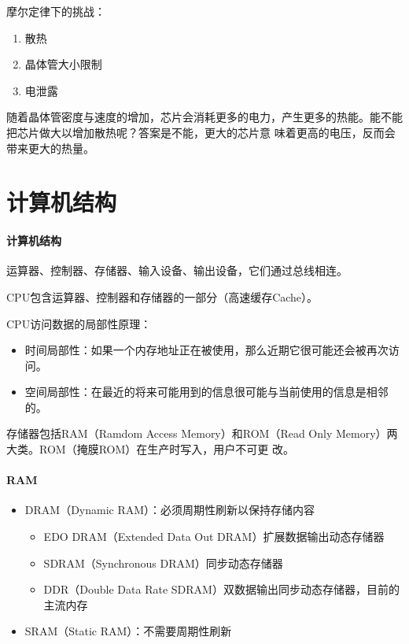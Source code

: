 \documentclass[UTF8]{ctexart}
\begin{document}
摩尔定律下的挑战：
\begin{enumerate}
    \item 散热
    \item 晶体管大小限制
    \item 电泄露
\end{enumerate}

随着晶体管密度与速度的增加，芯片会消耗更多的电力，产生更多的热能。能不能把芯片做大以增加散热呢？答案是不能，更大的芯片意
味着更高的电压，反而会带来更大的热量。

\section{计算机结构}
\paragraph{计算机结构}
运算器、控制器、存储器、输入设备、输出设备，它们通过总线相连。

CPU包含运算器、控制器和存储器的一部分（高速缓存Cache）。

CPU访问数据的局部性原理：
\begin{itemize}
    \item 时间局部性：如果一个内存地址正在被使用，那么近期它很可能还会被再次访问。
    \item 空间局部性：在最近的将来可能用到的信息很可能与当前使用的信息是相邻的。
\end{itemize}

存储器包括RAM（Ramdom Access Memory）和ROM（Read Only Memory）两大类。ROM（掩膜ROM）在生产时写入，用户不可更
改。

\paragraph{RAM}
\begin{itemize}
    \item DRAM（Dynamic RAM）：必须周期性刷新以保持存储内容
        \begin{itemize}
            \item EDO DRAM（Extended Data Out DRAM）扩展数据输出动态存储器
            \item SDRAM（Synchronous DRAM）同步动态存储器
            \item DDR（Double Data Rate SDRAM）双数据输出同步动态存储器，目前的主流内存
        \end{itemize}
    \item SRAM（Static RAM）：不需要周期性刷新
\end{itemize}
\end{document}
